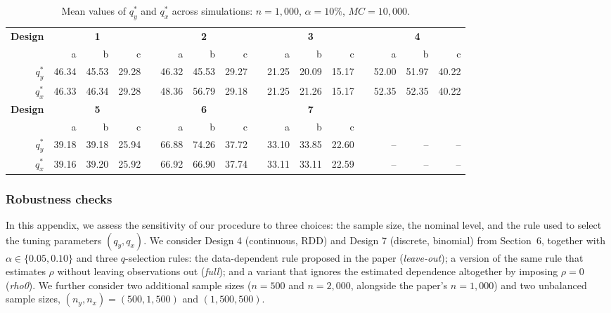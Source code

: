 \documentclass[11pt]{article}
\numberwithin{equation}{section}
\begin{document}
\begin{table}[h]\footnotesize
  \begin{center}
  \begin{tabular}{rrrrrrrrrrrrrrrr}
  \hline
  \multirow{2}{*}{\bf Design} \footnotesize
      & \multicolumn{3}{c}{\bf 1} & 
      & \multicolumn{3}{c}{\bf 2} & 
      & \multicolumn{3}{c}{\bf 3} &
      & \multicolumn{3}{c}{\bf 4} \\
  \cline{2-4} \cline{6-8} \cline{10-12} \cline{14-16}
   & a & b & c 
   & & a & b & c 
   & & a & b & c
   & & a & b & c \\
  \hline
  $q_y^*$ 
   & 46.34 & 45.53 & 29.28 
   & & 46.32 & 45.53 & 29.27 
   & & 21.25 & 20.09 & 15.17 
   & & 52.00 & 51.97 & 40.22 \\
  $q_x^*$ 
   & 46.33 & 46.34 & 29.28 
   & & 48.36 & 56.79 & 29.18 
   & & 21.25 & 21.26 & 15.17 
   & & 52.35 & 52.35 & 40.22 \\
  \hline
  
  \multirow{2}{*}{\bf Design} 
      & \multicolumn{3}{c}{\bf 5} & 
      & \multicolumn{3}{c}{\bf 6} & 
      & \multicolumn{3}{c}{\bf 7} &
      & \multicolumn{3}{c}{\bf } \\
  \cline{2-4} \cline{6-8} \cline{10-12} \cline{14-16}
   & a & b & c 
   & & a & b & c 
   & & a & b & c
   & &  &  &  \\
  \hline
  $q_y^*$ 
   & 39.18 & 39.18 & 25.94 
   & & 66.88 & 74.26 & 37.72 
   & & 33.10 & 33.85 & 22.60 
   & & -- & -- & -- \\
  $q_x^*$ 
   & 39.16 & 39.20 & 25.92 
   & & 66.92 & 66.90 & 37.74 
   & & 33.11 & 33.11 & 22.59 
   & & -- & -- & -- \\
  \hline
  \end{tabular}
  \caption{\footnotesize Mean values of $q_y^*$ and $q_x^*$ across simulations: $n=1,000$, $\alpha=10\%$, $MC=10,000$.}\label{tab:q-values}
  \end{center}
  \end{table}

\subsubsection{Robustness checks}

In this appendix, we assess the sensitivity of our procedure to three choices: the sample size, the nominal level, and the rule used to select the tuning parameters $(q_y,q_x)$. We consider Design 4 (continuous, RDD) and Design 7 (discrete, binomial) from Section~6, together with $\alpha \in \{0.05,0.10\}$ and three $q$-selection rules: the data-dependent rule proposed in the paper (\emph{leave-out}); a version of the same rule that estimates $\rho$ without leaving observations out (\emph{full}); and a variant that ignores the estimated dependence altogether by imposing $\rho=0$ (\emph{rho0}). We further consider two additional sample sizes ($n=500$ and $n=2{,}000$, alongside the paper's $n=1{,}000$) and two unbalanced sample sizes, $(n_y,n_x)=(500,1{,}500)$ and $(1{,}500,500)$.
\end{document}
